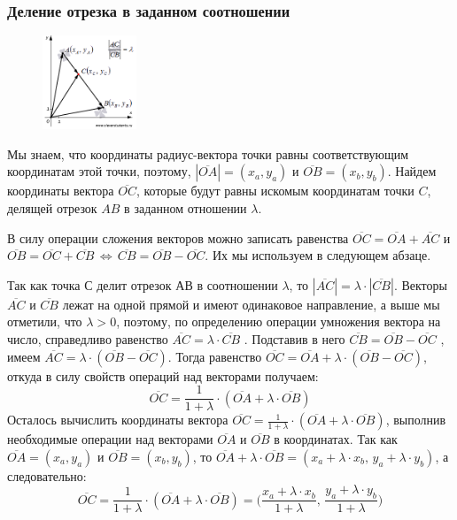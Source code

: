 \documentclass{article}
\begin{document}
\subsubsection{Деление отрезка в заданном соотношении}
\begin{figure}
\centering
\includegraphics[width=0.25\textwidth]{pict001.png}
\end{figure}
Мы знаем, что координаты радиус-вектора точки равны
соответствующим координатам этой точки, поэтому, $|\overline{OA}|=(x_a,y_a)$ и $\overline{OB}=(x_b,y_b)$. Найдем координаты вектора $\overline{OC}$,
которые будут равны искомым координатам точки $C$,
делящей отрезок $AB$ в заданном отношении $\lambda$.

В силу операции сложения векторов можно записать
равенства $\overline{OC}=\overline{OA}+\overline{AC}$ и $\overline{OB} = \overline{OC} +\overline{CB}\,\Leftrightarrow\,\overline{CB} = \overline{OB} - \overline{OC}$. Их мы используем в следующем абзаце.

Так как точка $С$ делит отрезок $АВ$ в соотношении $\lambda$, то $|\overline{AC}|=\lambda\cdot|\overline{CB}|$. Векторы $\overline{AC}$ и $\overline{CB}$ лежат на одной прямой и имеют одинаковое направление, а выше мы отметили, что $\lambda>0$, поэтому, по определению операции умножения вектора на число, справедливо равенство $\overline{AC} = \lambda\cdot\overline{CB}$ . Подставив в него $\overline{CB} = \overline{OB} - \overline{OC}$ , имеем $\overline{AC} = \lambda\cdot(\overline{OB} - \overline{OC})$.
Тогда равенство $\overline{OC} = \overline{OA} +\lambda\cdot(\overline{OB} - \overline{OC})$, откуда в силу свойств операций над векторами получаем: 
$$ \overline{OC} =\frac{1}{1+\lambda}\cdot(\overline{OA}+\lambda\cdot\overline{OB}) $$
Осталось вычислить координаты вектора $\overline{OC} =\frac{1}{1+\lambda}\cdot(\overline{OA}+\lambda\cdot\overline{OB})$, выполнив необходимые операции над векторами $\overline{OA}$ и $\overline{OB}$ в координатах. Так как $\overline{OA}=(x_a,y_a)$ и $\overline{OB}=(x_b,y_b)$, то $\overline{OA}+\lambda\cdot\overline{OB}=(x_a+\lambda\cdot x_b,\,y_a+\lambda\cdot y_b)$, а следовательно:
$$ \overline{OC}= \frac{1}{1+\lambda}\cdot(\overline{OA}+\lambda\cdot\overline{OB}) = \bigg(\frac{x_a+\lambda\cdot x_b}{1+\lambda},\,\frac{y_a+\lambda\cdot y_b}{1+\lambda}\bigg)$$
\newpage
\end{document}
